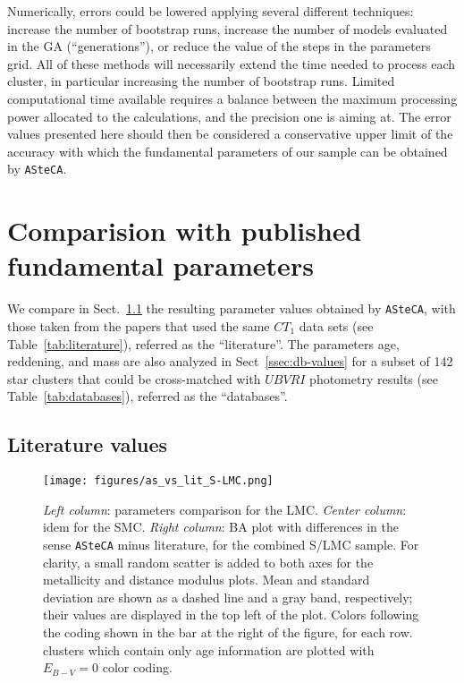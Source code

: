\documentclass[draft]{aa}
\begin{document}
Numerically, errors could be lowered applying several different techniques:
increase the number of bootstrap runs, increase the number of models evaluated
in the GA (``generations''), or reduce the value of the steps in the parameters
grid.
%
All of these methods will necessarily extend the time needed to process each
cluster, in particular increasing the number of bootstrap runs. Limited
computational time available requires a balance between the maximum processing
power allocated to the calculations, and the precision one is aiming at. The
error values presented here should then be considered a conservative upper limit
of the accuracy with which the fundamental parameters of our sample can be
obtained by \texttt{ASteCA}.\@





\section{Comparision with published fundamental parameters}
\label{sec:comp-pub-data}

We compare in Sect.~\ref{ssec:lit-values} the resulting parameter values
obtained by \texttt{ASteCA}, with those taken from the papers that used the same
$CT_1$ data sets (see Table~\ref{tab:literature}), referred as the
``literature''.
%
The parameters age, reddening, and mass are also analyzed in
Sect~\ref{ssec:db-values} for a subset of 142 star clusters that could be
cross-matched with $UBVRI$ photometry results (see Table~\ref{tab:databases}),
referred as the ``databases''.

  

\subsection{Literature values}
\label{ssec:lit-values}

\begin{figure*}
\texttt{[image: figures/as\_vs\_lit\_S-LMC.png]}
\caption{\emph{Left column}: parameters comparison for the LMC.\@
\emph{Center column}: idem for the SMC.\@
\emph{Right column}: BA plot with differences in the sense \texttt{ASteCA} minus
literature, for the combined S/LMC sample. For clarity, a small random scatter
is added to both axes for the metallicity and distance modulus plots. Mean and
standard deviation are shown as a dashed line and a gray band, respectively;
their values are displayed in the top left of the plot.
Colors following the coding shown in the bar at the right of the figure, for
each row.~\cite{Piatti_2011b} clusters which contain only age information are
plotted with $E_{B-V}{=}0$ color coding.}
\label{fig:as_vs_lit}
\end{figure*}
\end{document}
